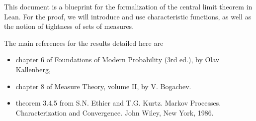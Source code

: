 
This document is a blueprint for the formalization of the central limit theorem in Lean.
For the proof, we will introduce and use characteristic functions, as well as the notion of tightness of sets of measures.

The main references for the results detailed here are
\begin{itemize}
	\item chapter 6 of Foundations of Modern Probability (3rd ed.), by Olav Kallenberg,
	\item chapter 8 of Measure Theory, volume II, by V. Bogachev.
	\item theorem 3.4.5 from S.N. Ethier and T.G. Kurtz. Markov Processes. Characterization and Convergence. John Wiley, New York, 1986.
\end{itemize}






